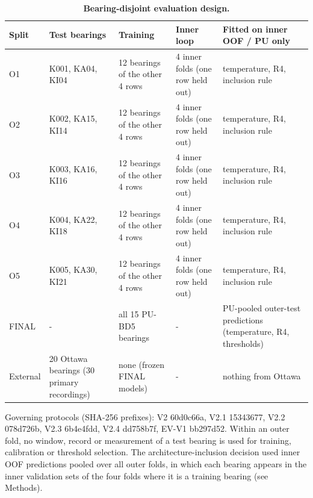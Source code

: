 \begin{table}[!ht]
\centering
\caption{\textbf{Bearing-disjoint evaluation design.}}
{\footnotesize
\begin{tabular}{|l|p{2.8cm}|p{2.6cm}|p{2.3cm}|p{3.2cm}|}
\hline
Split & Test bearings & Training & Inner loop & Fitted on inner OOF / PU only \\ \hline
O1 & K001, KA04, KI04 & 12 bearings of the other 4 rows & 4 inner folds (one row held out) & temperature, R4, inclusion rule \\ \hline
O2 & K002, KA15, KI14 & 12 bearings of the other 4 rows & 4 inner folds (one row held out) & temperature, R4, inclusion rule \\ \hline
O3 & K003, KA16, KI16 & 12 bearings of the other 4 rows & 4 inner folds (one row held out) & temperature, R4, inclusion rule \\ \hline
O4 & K004, KA22, KI18 & 12 bearings of the other 4 rows & 4 inner folds (one row held out) & temperature, R4, inclusion rule \\ \hline
O5 & K005, KA30, KI21 & 12 bearings of the other 4 rows & 4 inner folds (one row held out) & temperature, R4, inclusion rule \\ \hline
FINAL & - & all 15 PU-BD5 bearings & - & PU-pooled outer-test predictions (temperature, R4, thresholds) \\ \hline
External & 20 Ottawa bearings (30 primary recordings) & none (frozen FINAL models) & - & nothing from Ottawa \\ \hline
\end{tabular}}
\begin{flushleft} Governing protocols (SHA-256 prefixes): V2 60d0c66a, V2.1 15343677, V2.2 078d726b, V2.3 6b4e4fdd, V2.4 dd758b7f, EV-V1 bb297d52. Within an outer fold, no window, record or measurement of a test bearing is used for training, calibration or threshold selection. The architecture-inclusion decision used inner OOF predictions pooled over all outer folds, in which each bearing appears in the inner validation sets of the four folds where it is a training bearing (see Methods). \end{flushleft}
\label{tab:splits}
\end{table}